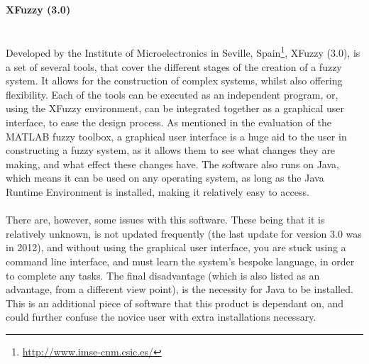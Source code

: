 \paragraph{XFuzzy (3.0)}\ \\
Developed by the Institute of Microelectronics in Seville, Spain\footnote{\url{http://www.imse-cnm.csic.es/}}, XFuzzy (3.0), is a set of several tools, that cover the different stages of the creation of a fuzzy system. It allows for the construction of complex systems, whilst also offering flexibility. Each of the tools can be executed as an independent program, or, using the XFuzzy environment, can be integrated together as a graphical user interface, to ease the design process. As mentioned in the evaluation of the MATLAB fuzzy toolbox, a graphical user interface is a huge aid to the user in constructing a fuzzy system, as it allows them to see what changes they are making, and what effect these changes have. The software also runs on Java, which means it can be used on any operating system, as long as the Java Runtime Environment is installed, making it relatively easy to access. \ \\
\ \\
There are, however, some issues with this software. These being that it is relatively unknown, is not updated frequently (the last update for version 3.0 was in 2012), and without using the graphical user interface, you are stuck using a command line interface, and must learn the system's bespoke language, in order to complete any tasks. The final disadvantage (which is also listed as an advantage, from a different view point), is the necessity for Java to be installed. This is an additional piece of software that this product is dependant on, and could further confuse the novice user with extra installations necessary. 


